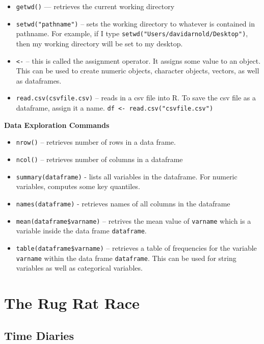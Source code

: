 \documentclass[
]{book}
\begin{document}
\begin{itemize}
\item
  \texttt{getwd()} --- retrieves the current working directory
\item
  \texttt{setwd("pathname")} -- sets the working directory to whatever is contained in pathname. For example, if I type \texttt{setwd("Users/davidarnold/Desktop")}, then my working directory will be set to my desktop.
\item
  \texttt{\textless{}-} -- this is called the assignment operator. It assigns some value to an object. This can be used to create numeric objects, character objects, vectors, as well as dataframes.
\item
  \texttt{read.csv(csvfile.csv)} -- reads in a csv file into R. To save the csv file as a dataframe, assign it a name. \texttt{df\ \textless{}-\ read.csv("csvfile.csv")}
\end{itemize}

\textbf{Data Exploration Commands}

\begin{itemize}
\item
  \texttt{nrow()} -- retrieves number of rows in a data frame.
\item
  \texttt{ncol()} -- retrieves number of columns in a dataframe
\item
  \texttt{summary(dataframe)} - lists all variables in the dataframe. For numeric variables, computes some key quantiles.
\item
  \texttt{names(dataframe)} - retrieves names of all columns in the dataframe
\item
  \texttt{mean(dataframe\$varname)} -- retrives the mean value of \texttt{varname} which is a variable inside the data frame \texttt{dataframe}.
\item
  \texttt{table(dataframe\$varname)} -- retrieves a table of frequencies for the variable \texttt{varname} within the data frame \texttt{dataframe}. This can be used for string variables as well as categorical variables.
\end{itemize}

\chapter{The Rug Rat Race}\label{the-rug-rat-race}

\section{Time Diaries}\label{time-diaries}
\end{document}
